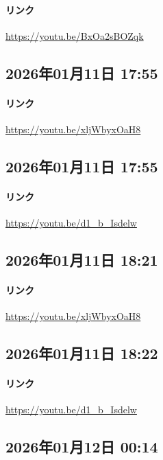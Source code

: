 \paragraph{リンク}
\url{https://youtu.be/BxOa2sBOZqk}

\subsection*{2026年01月11日 17:55}

\paragraph{リンク}
\url{https://youtu.be/xljWbyxOaH8}

\subsection*{2026年01月11日 17:55}

\paragraph{リンク}
\url{https://youtu.be/d1_b_Isdelw}

\subsection*{2026年01月11日 18:21}

\paragraph{リンク}
\url{https://youtu.be/xljWbyxOaH8}

\subsection*{2026年01月11日 18:22}

\paragraph{リンク}
\url{https://youtu.be/d1_b_Isdelw}

\subsection*{2026年01月12日 00:14}

